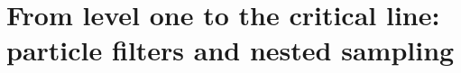 \chapter{From level one to the critical line: particle filters and nested sampling}\label{vol2:ch12}





